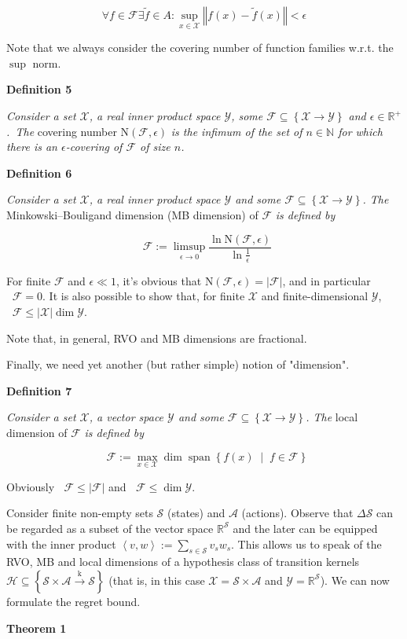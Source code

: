 \documentclass[a4paper]{article}
\newcommand{\Co}[1]{}
\DeclareMathOperator{\Sp}{span}
\newcommand{\AC}[1]{\left\{#1\right\}}
\newcommand{\ACM}[2]{\left\{#1\;\middle\vert\;#2\right\}}
\newcommand{\Nats}{\mathbb{N}}
\newcommand{\Reals}{\mathbb{R}}
\newcommand{\Abs}[1]{\left\vert #1 \right\vert}
\newcommand{\Norm}[1]{\left\Vert #1 \right\Vert}
\newcommand{\Chev}[1]{\left\langle #1 \right\rangle}
\newcommand{\K}{\xrightarrow{\mathrm{k}}}
\newcommand{\X}{\mathcal{X}}
\newcommand{\Y}{\mathcal{Y}}
\newcommand{\F}{\mathcal{F}}
\newcommand{\St}{\mathcal{S}}
\newcommand{\A}{\mathcal{A}}
\newcommand{\Hy}{\mathcal{H}}
\DeclareMathOperator{\MB}{\dim_{MB}}
\DeclareMathOperator{\LD}{\dim_{loc}}
\newcommand{\N}{\mathrm{N}}
\begin{document}
$$\forall f\in\F\exists\tilde{f}\in A: \sup_{x\in\X}\Norm{f(x)-\tilde{f}(x)}<\epsilon$$

Note that we always consider the covering number of function families w.r.t. the $\sup$ norm.

\textbf{Definition 5}\Co{b}

\textit{Consider a set $\X$, a real inner product space $\Y$, some $\F\subseteq\AC{\X\rightarrow\Y}$ and $\epsilon\in\Reals^+$.\ The}\Co{i} covering number $\N(\F,\epsilon)$ \textit{is the infimum of the set of $n\in\Nats$ for which there is an $\epsilon$-covering of $\F$ of size $n$.}\Co{i}

\textbf{Definition 6}\Co{b}

\textit{Consider a set $\X$, a real inner product space $\Y$ and some $\F\subseteq\AC{\X\rightarrow\Y}$. The}\Co{i} Minkowski–Bouligand dimension (MB dimension) of $\F$ \textit{is defined by}\Co{i}

$$\MB{\F}:=\limsup_{\epsilon \rightarrow 0}{\frac{\ln{\N(\F,\epsilon)}}{\ln\frac{1}{\epsilon}}}$$

For finite $\F$ and $\epsilon\ll1$, it's obvious that $\N(\F,\epsilon)=\Abs{\F}$, and in particular $\MB\F=0$. It is also possible to show that, for finite $\X$ and finite-dimensional $\Y$, $\MB{\F}\leq\Abs{\X}\dim{\Y}$.

Note that, in general, RVO and MB dimensions are fractional.

Finally, we need yet another (but rather simple) notion of "dimension".

\textbf{Definition 7}\Co{b}

\textit{Consider a set $\X$, a vector space $\Y$ and some $\F\subseteq\AC{\X\rightarrow\Y}$. The}\Co{i} local dimension of $\F$ \textit{is defined by}\Co{i}

$$\LD{\F}:=\max_{x\in\X}{\dim\Sp\ACM{f(x)}{f\in\F}}$$

Obviously $\LD{\F}\leq\Abs{\F}$ and $\LD{\F}\leq\dim{\Y}$.

Consider finite non-empty sets $\St$ (states) and $\A$ (actions). Observe that $\Delta\St$ can be regarded as a subset of the vector space $\Reals^\St$ and the later can be equipped with the inner product $\Chev{v,w}:=\sum_{s\in\St} v_s w_s$. This allows us to speak of the RVO, MB and local dimensions of a hypothesis class of transition kernels $\Hy\subseteq\AC{\St\times\A\K\St}$ (that is, in this case $\X=\St\times\A$ and $\Y=\Reals^\St$). We can now formulate the regret bound.

\textbf{Theorem 1}\Co{b}
\end{document}
